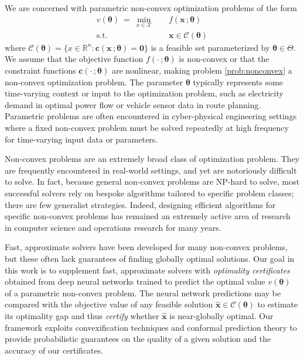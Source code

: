\documentclass[10pt]{article} %
\theoremstyle{plain}
\theoremstyle{definition}
\theoremstyle{remark}
\begin{document}
We are concerned with parametric non-convex optimization problems of the form
\begin{equation}
\label{prob:nonconvex}
\begin{aligned}
    v(\bm{\theta}) ~=~ \min_{x \in \mathcal{X}} \quad & f(\mathbf{x}\,;\bm{\theta}) \\
    \text{s.t.} \quad & \mathbf{x} \in \mathcal{C}(\bm{\theta})
\end{aligned}
\end{equation}
where $\mathcal{C}(\bm{\theta}) = \{x \in \mathbb{R}^n: \mathbf{c}(\mathbf{x} \,; \bm{\theta}) = \mathbf{0}\}$ is a feasible set parameterized by $\bm{\theta} \in \Theta$. We assume that the objective function $f(\cdot\,; \bm{\theta})$ is non-convex or that the constraint functions $\mathbf{c}(\cdot\,;\bm{\theta})$ are nonlinear, making problem \cref{prob:nonconvex}{}{} a non-convex optimization problem. The parameter $\bm{\theta}$ typically represents some time-varying context or input to the optimization problem, such as electricity demand in optimal power flow or vehicle sensor data in route planning. Parametric problems are often encountered in cyber-physical engineering settings where a fixed non-convex problem must be solved repeatedly at high frequency for time-varying input data or parameters.

Non-convex problems are an extremely broad class of optimization problem. They are frequently encountered in real-world settings, and yet are notoriously difficult to solve. In fact, because general non-convex problems are NP-hard to solve, most successful solvers rely on bespoke algorithms tailored to specific problem classes; there are few generalist strategies. Indeed, designing efficient algorithms for specific non-convex problems has remained an extremely active area of research in computer science and operations research for many years.

Fast, approximate solvers have been developed for many non-convex problems, but these often lack guarantees of finding globally optimal solutions. Our goal in this work is to supplement fast, approximate solvers with \textit{optimality certificates} obtained from deep neural networks trained to predict the optimal value $v(\bm{\theta})$ of a parametric non-convex problem. The neural network predictions may be compared with the objective value of any feasible solution $\hat{\bm{x}} \in \mathcal{C}(\bm{\theta})$ to estimate its optimality gap and thus \textit{certify} whether $\hat{\bm{x}}$ is near-globally optimal. Our framework exploits convexification techniques and conformal prediction theory to provide probabilistic guarantees on the quality of a given solution and the accuracy of our certificates.
\end{document}

